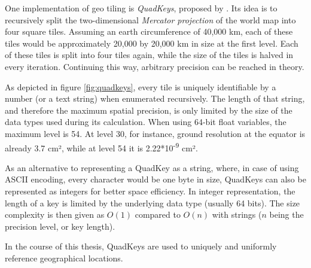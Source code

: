 One implementation of geo tiling is \textit{QuadKeys}, proposed by \cite{Schwartz2018}. Its idea is to recursively split the two-dimensional \textit{Mercator projection} of the world map into four square tiles. Assuming an earth circumference of 40,000 km, each of these tiles would be approximately 20,000 by 20,000 km in size at the first level. Each of these tiles is split into four tiles again, while the size of the tiles is halved in every iteration. Continuing this way, arbitrary precision can be reached in theory.

As depicted in figure \ref{fig:quadkeys}, every tile is uniquely identifiable by a number (or a text string) when enumerated recursively. The length of that string, and therefore the maximum spatial precision, is only limited by the size of the data types used during its calculation. When using 64-bit float variables, the maximum level is 54. At level 30, for instance, ground resolution at the equator is already 3.7 cm², while at level 54 it is 2.22*10\textsuperscript{-9} cm².

As an alternative to representing a QuadKey as a string, where, in case of using ASCII encoding, every character would be one byte in size, QuadKeys can also be represented as integers for better space efficiency. In integer representation, the length of a key is limited by the underlying data type (usually 64 bits). The size complexity is then given as $O(1)$ compared to $O(n)$ with strings ($n$ being the precision level, or key length).

\par
\bigskip

In the course of this thesis, QuadKeys are used to uniquely and uniformly reference geographical locations. 